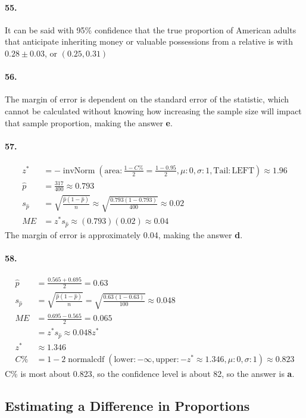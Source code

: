 \documentclass[12pt, A4]{article}
\DeclareMathOperator{\invNorm}{invNorm}
\DeclareMathOperator{\normalcdf}{normalcdf}
\newcommand{\invNormal}[4]{\invNorm\left(\mathrm{area}:#1, \mu: #2, \sigma: #3, \mathrm{Tail: #4}\right)}
\newcommand{\normalCDF}[4]{\normalcdf\left(\mathrm{lower}: #1, \mathrm{upper}: #2, \mu: #3, \sigma: #4\right)}
\newcommand{\propse}[2]{\sqrt{\frac{#1\left(1 - #1\right)}{#2}}}
\begin{document}
		\paragraph{55.}
			It can be said with 95\% confidence that the true proportion of American adults that anticipate inheriting money or valuable possessions from a relative is with $0.28 \pm 0.03$, or $(0.25, 0.31)$
		\paragraph{56.}
			The margin of error is dependent on the standard error of the statistic, which cannot be calculated without knowing how increasing the sample size will impact that sample proportion, making the answer \textbf{e}.
		\paragraph{57.}
			\begin{align*}
				z^* &= -\invNormal{\frac{1 - C\%}{2} = \frac{1 - 0.95}{2}}{0}{1}{LEFT} \approx 1.96 \\
				\hat{p} &= \frac{317}{400} \approx 0.793 \\
				s_{\hat{p}} &= \propse{\hat{p}}{n} \approx \propse{0.793}{400} \approx 0.02  \\
				ME &= z^*s_{\hat{p}} \approx (0.793)(0.02) \approx 0.04
			\end{align*}
			The margin of error is approximately 0.04, making the answer \textbf{d}.
		\paragraph{58.}
			\begin{align*}
				\hat{p} &= \frac{0.565 + 0.695}{2} = 0.63 \\
				s_{\hat{p}} &= \sqrt{\frac{\hat{p}(1 - \hat{p})}{n}} = \sqrt{\frac{0.63(1 - 0.63)}{100}} \approx 0.048 \\
				ME &= \frac{0.695 - 0.565}{2} = 0.065 \\
					&= z^*s_{\hat{p}} \approx 0.048z^* \\
				z^* &\approx 1.346 \\
				C\% &= 1 - 2\normalCDF{-\infty}{-z^* \approx 1.346}{0}{1} \approx 0.823
			\end{align*}
			C\% is most about 0.823, so the confidence level is about 82, so the answer is \textbf{a}.
	\subsection{Estimating a Difference in Proportions}
\end{document}
